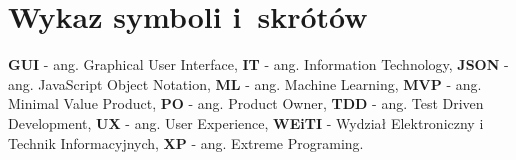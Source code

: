 \chapter*{Wykaz symboli i~skrótów}

\noindent
\textbf{GUI} - ang. Graphical User Interface, \newline
\textbf{IT} - ang. Information Technology, \newline
\textbf{JSON} - ang. JavaScript Object Notation, \newline
\textbf{ML} - ang. Machine Learning, \newline
\textbf{MVP} - ang. Minimal Value Product, \newline
\textbf{PO} - ang. Product Owner, \newline
\textbf{TDD} - ang. Test Driven Development, \newline
\textbf{UX} - ang. User Experience, \newline
\textbf{WEiTI} - Wydział Elektroniczny i Technik Informacyjnych, \newline
\textbf{XP} - ang. Extreme Programing. \newline

\cleardoublepage